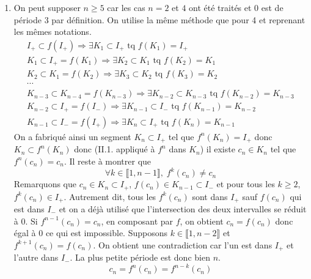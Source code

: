 \begin{enumerate}
  \item On peut supposer $n\geq 5$ car les cas $n=2$ et $4$ ont été traités et $0$ est de période $3$ par définition. On utilise la même méthode que pour 4 et reprenant les mêmes notations.
\begin{multline*}
I_+\subset f(I_+) \Rightarrow \exists K_1\subset I_+ \text{ tq } f(K_1)=I_+ \\ 
K_1 \subset I_+ = f(K_1) \Rightarrow \exists K_2\subset K_1 \text{ tq } f(K_2) = K_1 \\
K_2 \subset K_1 = f(K_2) \Rightarrow \exists K_3\subset K_2 \text{ tq } f(K_3) = K_2 \\
\cdots \\
K_{n-3} \subset K_{n-4} = f(K_{n-3}) \Rightarrow \exists K_{n-2}\subset K_{n-3} \text{ tq } f(K_{n-2}) = K_{n-3} \\
K_{n-2} \subset I_+ = f(I_-) \Rightarrow \exists K_{n-1}\subset I_- \text{ tq } f(K_{n-1}) = K_{n-2} \\
K_{n-1} \subset I_- = f(I_+) \Rightarrow \exists K_{n}\subset I_+ \text{ tq } f(K_{n}) = K_{n-1} 
\end{multline*}
On a fabriqué ainsi un segment $K_n\subset I_+$ tel que $f^n(K_n)=I_+$ donc $K_n \subset f^n(K_n)$ donc (II.1. appliqué à $f^n$ dans $K_n$) il existe $c_n\in K_n$ tel que $f^n(c_n)=c_n$.\newline
Il reste à montrer que
\begin{displaymath}
  \forall k\in \llbracket 1,n-1\rrbracket, \; f^k(c_n)\neq c_n
\end{displaymath}
Remarquons que $c_n\in K_n \subset I_+$, $f(c_n)\in K_{n-1}\subset I_-$ et pour tous les $k\geq 2$, $f^k(c_n)\in I_+$. Autrement dit, tous les $f^k(c_n)$ sont dans $I_+$ sauf $f(c_n)$ qui est dans $I_-$ et on a déjà utilisé que l'intersection des deux intervalles se réduit à $0$.\newline
Si $f^{n-1}(c_n)=c_n$, en composant par $f$, on obtient $c_n = f(c_n)$ donc égal à $0$ ce qui est impossible.
Supposons $k\in \llbracket 1,n-2\rrbracket$ et $f^{k+1}(c_n)= f(c_n)$. On obtient une contradiction car l'un est dans $I_+$ et l'autre dans $I_-$. La plus petite période est donc bien $n$.
\begin{displaymath}
  c_n = f^n(c_n) = f^{n-k}(c_n)
\end{displaymath}

\end{enumerate}
